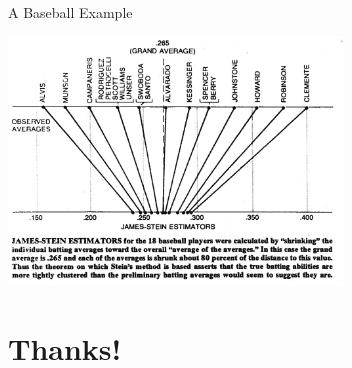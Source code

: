 \documentclass[xcolor=pdftex,dvipsnames,table,mathserif,aspectratio=169]{beamer}
\begin{document}
\begin{frame}[fragile]{A Baseball Example}
\begin{center}
\includegraphics[width=3.5in]{./resources/baseball2.png}
\end{center}
\end{frame}

\section*{Thanks!}
\end{document}
